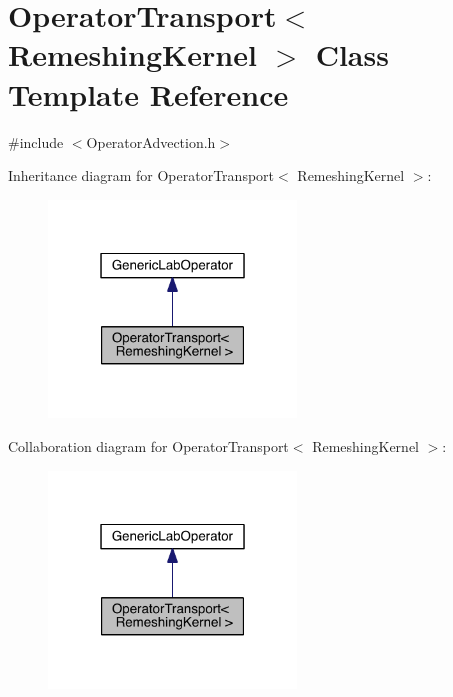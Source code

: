 \hypertarget{class_operator_transport}{}\section{Operator\+Transport$<$ Remeshing\+Kernel $>$ Class Template Reference}
\label{class_operator_transport}


{\ttfamily \#include $<$Operator\+Advection.\+h$>$}



Inheritance diagram for Operator\+Transport$<$ Remeshing\+Kernel $>$\+:\nopagebreak
\begin{figure}[H]
\begin{center}
\leavevmode
\includegraphics[width=187pt]{d0/d06/class_operator_transport__inherit__graph}
\end{center}
\end{figure}


Collaboration diagram for Operator\+Transport$<$ Remeshing\+Kernel $>$\+:\nopagebreak
\begin{figure}[H]
\begin{center}
\leavevmode
\includegraphics[width=187pt]{d7/d23/class_operator_transport__coll__graph}
\end{center}
\end{figure}
